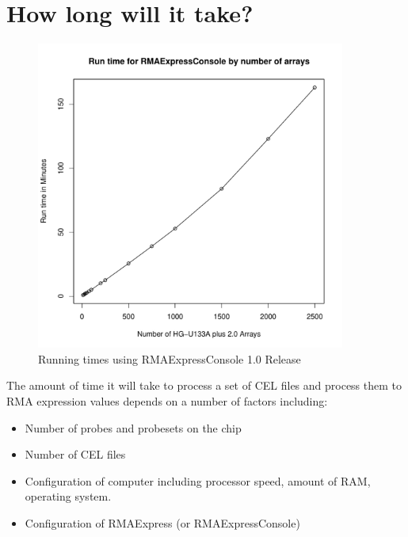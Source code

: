 \documentclass[11pt]{report}
\begin{document}
\section{How long will it take?}


\begin{figure}
\centering
\includegraphics[width=4in,height=4in]{Runtimes.pdf}
\caption{Running times using RMAExpressConsole 1.0 Release} \label{timingtest}
\end{figure}

The amount of time it will take to process a set of CEL files and process them to RMA expression values depends on a number of factors including:
\begin{itemize}
\item Number of probes and probesets on the chip
\item Number of CEL files
\item Configuration of computer including processor speed, amount of RAM, operating system.
\item Configuration of RMAExpress (or RMAExpressConsole)
\end{itemize}
\end{document}
